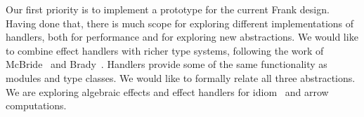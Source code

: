 \documentclass[preprint]{sigplanconf}
\begin{document}
Our first priority is to implement a prototype for the current Frank
design. Having done that, there is much scope for exploring different
implementations of handlers, both for performance and for exploring
new abstractions.
%
We would like to combine effect handlers with richer type systems,
following the work of McBride~\cite{McBride11} and
Brady~\cite{Brady13}.
%
Handlers provide some of the same functionality as modules and type
classes. We would like to formally relate all three abstractions.
%
We are exploring algebraic effects and effect handlers for
idiom~\cite{McbrideP08} and arrow~\cite{Hughes04} computations.























\end{document}

